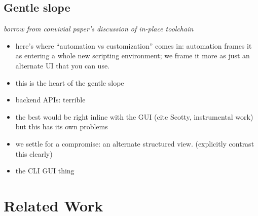 \documentclass[sigplan,10pt,anonymous,review]{acmart}
\providecommand{\tightlist}{%
  \setlength{\itemsep}{0pt}\setlength{\parskip}{0pt}}
\begin{document}
\hypertarget{gentle-slope}{%
\subsection{Gentle slope}\label{gentle-slope}}

\emph{borrow from convivial paper's discussion of in-place toolchain}

\begin{itemize}
\tightlist
\item
  here's where ``automation vs customization'' comes in: automation
  frames it as entering a whole new scripting environment; we frame it
  more as just an alternate UI that you can use.
\item
  this is the heart of the gentle slope
\item
  backend APIs: terrible
\item
  the best would be right inline with the GUI (cite Scotty, instrumental
  work) but this has its own problems
\item
  we settle for a compromise: an alternate structured view. (explicitly
  contrast this clearly)
\item
  the CLI GUI thing
\end{itemize}

\hypertarget{sec:related-work}{%
\section{Related Work}\label{sec:related-work}}
\end{document}
